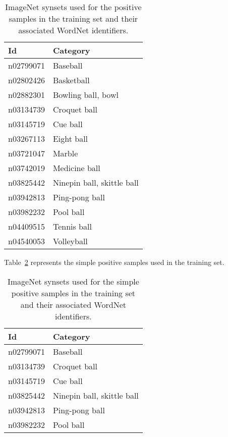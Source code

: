 \documentclass{llncs}
\begin{document}
{{			\begin{table}
				\centering
				\caption{ImageNet synsets used for the positive samples in the training set and their associated WordNet identifiers.}
				\label{tab:positive_samples}
				\begin{tabularx}{\textwidth}{lX}
					\toprule
					\textbf{Id} & \textbf{Category} \\
					\midrule
						n02799071 & Baseball \\
						n02802426 & Basketball \\
						n02882301 & Bowling ball, bowl \\
						n03134739 & Croquet ball \\
						n03145719 & Cue ball \\
						n03267113 & Eight ball \\
						n03721047 & Marble \\
						n03742019 & Medicine ball \\
						n03825442 & Ninepin ball, skittle ball \\
						n03942813 & Ping-pong ball \\
						n03982232 & Pool ball \\
						n04409515 & Tennis ball \\
						n04540053 & Volleyball \\
					\bottomrule
				\end{tabularx}
			\end{table}

			Table~\ref{tab:positive_samples_simple} represents the simple positive samples used in the training set.

			\begin{table}
				\centering
				\caption{ImageNet synsets used for the simple positive samples in the training set and their associated WordNet identifiers.}
				\label{tab:positive_samples_simple}
				\begin{tabularx}{\textwidth}{lX}
					\toprule
					\textbf{Id} & \textbf{Category} \\
					\midrule
						n02799071 & Baseball \\
						n03134739 & Croquet ball \\
						n03145719 & Cue ball \\
						n03825442 & Ninepin ball, skittle ball \\
						n03942813 & Ping-pong ball \\
						n03982232 & Pool ball \\
					\bottomrule
				\end{tabularx}
			\end{table}

}}
\end{document}
